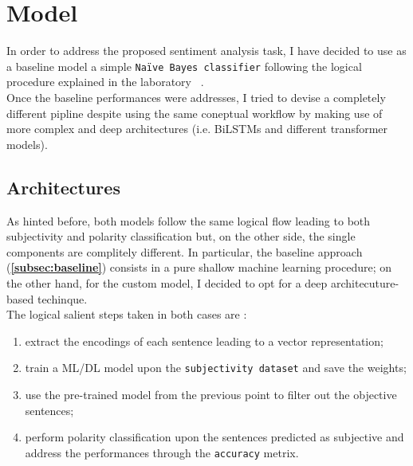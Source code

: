 
\section{Model}
\label{sec:model}
In order to address the proposed sentiment analysis task, I have decided to use as a baseline model a simple \texttt{Na\"{i}ve Bayes classifier} following the logical procedure explained in the  laboratory ~\cite{lab11}.\\
Once the baseline performances were addresses, I tried to devise a completely different pipline despite using the same coneptual workflow by making use of more complex and deep architectures (i.e. BiLSTMs and different transformer models). \\

\subsection{Architectures}
As hinted before, both models follow the same logical flow leading to both subjectivity and polarity classification but, on the other side, 
the single components are complitely different. In particular, the baseline approach (\textbf{\ref{subsec:baseline}}) consists in a pure shallow machine learning procedure; 
on the other hand, for the custom model, I decided to opt for a deep architecuture-based techinque.\\
The logical salient steps taken in both cases are :
\begin{enumerate}
    \item extract the encodings of each sentence leading to a vector representation;
    \item train a ML/DL model upon the \texttt{subjectivity dataset} and save the weights;
    \item use the pre-trained model from the previous point to filter out the objective sentences;
    \item perform polarity classification upon the sentences predicted as subjective and address the performances through the \texttt{accuracy} metrix.
\end{enumerate}

